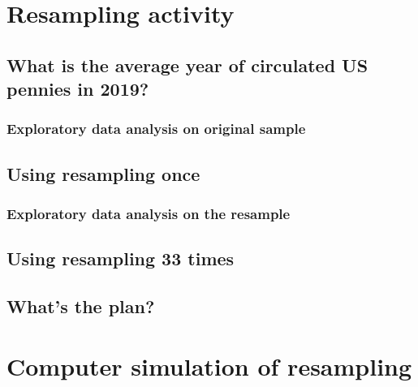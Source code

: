 \documentclass[
  12pt, krantz2,
]{krantz}
\begin{document}
\hypertarget{resampling-activity}{%
\section{Resampling activity}\label{resampling-activity}}

\hypertarget{what-is-the-average-year-of-circulated-us-pennies-in-2019}{%
\subsection{What is the average year of circulated US pennies in 2019?}\label{what-is-the-average-year-of-circulated-us-pennies-in-2019}}

\hypertarget{exploratory-data-analysis-on-original-sample}{%
\subsubsection*{Exploratory data analysis on original sample}\label{exploratory-data-analysis-on-original-sample}}


\hypertarget{using-resampling-once}{%
\subsection{Using resampling once}\label{using-resampling-once}}

\hypertarget{exploratory-data-analysis-on-the-resample}{%
\subsubsection*{Exploratory data analysis on the resample}\label{exploratory-data-analysis-on-the-resample}}


\hypertarget{student-resamples}{%
\subsection{Using resampling 33 times}\label{student-resamples}}

\hypertarget{whats-the-plan}{%
\subsection{What's the plan?}\label{whats-the-plan}}

\hypertarget{resampling-simulation}{%
\section{Computer simulation of resampling}\label{resampling-simulation}}
\end{document}
